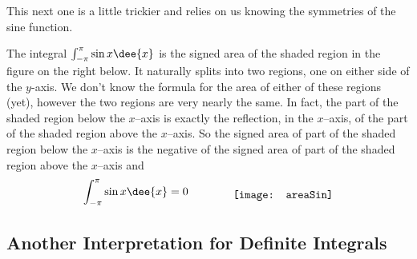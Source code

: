 This next one is a little trickier and relies on us knowing the symmetries of the
sine
function.
\begin{eg}
The integral $\int_{-\pi}^\pi \sin x\dee{x}$  is the signed area of
the shaded region in the figure on the right below. It naturally splits into
two
regions, one on either side of the $y$-axis. We don't know the formula for the
area of
either of these regions (yet), however the two regions are very nearly the same.
In
fact, the part of the
shaded region below the $x$--axis is exactly the reflection, in the $x$--axis,
of the part of the shaded region above the $x$--axis. So the signed area
of part of the shaded region below the $x$--axis is the negative of the
signed area of part of the shaded region above the $x$--axis and
\begin{align*}
\int_{-\pi}^\pi \sin x\dee{x} = 0\qquad\qquad
\raisebox{-0.4\height}{\texttt{[image: areaSin]}}
\end{align*}
\end{eg}

\subsection{Another Interpretation for Definite Integrals}\label{ssec velocity}

